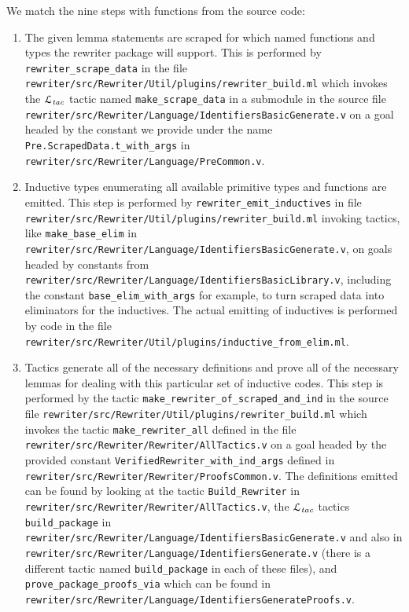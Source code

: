 \documentclass[a4paper,USenglish,cleveref,autoref,thm-restate]{lipics-v2021}
\newcommand{\Ltac}{\ensuremath{\mathcal{L}_\text{\emph{tac}}}}
\begin{document}
\begin{minipage}[t][1cm]{\textwidth}
We match the nine steps with functions from the source code:
\begin{enumerate}
  \item
    The given lemma statements are scraped for which named functions and types the rewriter package will support.
    This is performed by \texttt{rewriter\_scrape\_data} in the file \texttt{rewriter/src/Rewriter/Util/plugins/rewriter\_build.ml} which invokes the \Ltac{} tactic named \texttt{make\_scrape\_data} in a submodule in the source file \texttt{rewriter/src/Rewriter/Language/IdentifiersBasicGenerate.v} on a goal headed by the constant we provide under the name \texttt{Pre.ScrapedData.t\_with\_args} in \texttt{rewriter/src/Rewriter/Language/PreCommon.v}.
  \item
    Inductive types enumerating all available primitive types and functions are emitted.
    This step is performed by \texttt{rewriter\_emit\_inductives} in file \texttt{rewriter/src/Rewriter/Util/plugins/rewriter\_build.ml} invoking tactics, like \texttt{make\_base\_elim} in \texttt{rewriter/src/Rewriter/Language/IdentifiersBasicGenerate.v}, on goals headed by constants from \texttt{rewriter/src/Rewriter/Language/IdentifiersBasicLibrary.v}, including the constant \texttt{base\_elim\_with\_args} for example, to turn scraped data into eliminators for the inductives.
    The actual emitting of inductives is performed by code in the file \texttt{rewriter/src/Rewriter/Util/plugins/inductive\_from\_elim.ml}.
  \item
    Tactics generate all of the necessary definitions and prove all of the necessary lemmas for dealing with this particular set of inductive codes.
    This step is performed by the tactic \texttt{make\_rewriter\_of\_scraped\_and\_ind} in the source file \texttt{rewriter/src/Rewriter/Util/plugins/rewriter\_build.ml} which invokes the tactic \texttt{make\_rewriter\_all} defined in the file \texttt{rewriter/src/Rewriter/Rewriter/AllTactics.v} on a goal headed by the provided constant \texttt{VerifiedRewriter\_with\_ind\_args} defined in \texttt{rewriter/src/Rewriter/Rewriter/ProofsCommon.v}.
    The definitions emitted can be found by looking at the tactic \texttt{Build\_Rewriter} in \texttt{rewriter/src/Rewriter/Rewriter/AllTactics.v}, the \Ltac{} tactics \texttt{build\_package} in \texttt{rewriter/src/Rewriter/Language/IdentifiersBasicGenerate.v} and also in \texttt{rewriter/src/Rewriter/Language/IdentifiersGenerate.v} (there is a different tactic named \texttt{build\_package} in each of these files), and \texttt{prove\_package\_proofs\_via} which can be found in \texttt{rewriter/src/Rewriter/Language/IdentifiersGenerateProofs.v}.

\end{enumerate}
\end{minipage}
\end{document}
